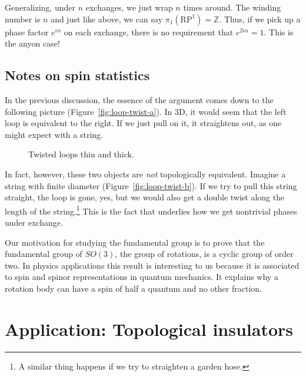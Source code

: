 \documentclass[12pt, english]{book}
\begin{document}
Generalizing, under $n$ exchanges, we just wrap $n$ times around.
The winding number is $n$ and just like above, we can say $\pi_1 (\mathrm{RP}^1) = \mathbb{Z}$.
Thus, if we pick up a phase factor $e^{i\alpha}$ on each exchange, there is no requirement that $e^{2i \alpha} = 1$.
This is the anyon case!


\subsection{Notes on spin statistics}

In the previous discussion, the essence of the argument comes down to the following picture (Figure~\ref{fig:loop-twist-a}).
In 3D, it would seem that the left loop is equivalent to the right.
If we just pull on it, it straightens out, as one might expect with a string.

\begin{figure}[!ht]
	\centering 
	 \hspace{8ex} 
	\caption{Twisted loops thin and thick.}
	\label{fig:loop-twist}
\end{figure}

In fact, however, these two objects are \emph{not} topologically equivalent.
Imagine a string with finite diameter (Figure~\ref{fig:loop-twist-b}).
If we try to pull this string straight, the loop is gone, yes, but we would also get a double twist along the length of the string.\footnote{A similar thing happens if we try to straighten a garden hose.}
This is the fact that underlies how we get nontrivial phases under exchange.


Our motivation for studying the fundamental group is to prove that the fundamental group of $SO(3)$, the group of rotations, is a cyclic group of order two. 
In physics applications this result is interesting to us because it is associated to spin and spinor representations in quantum mechanics. 
It explains why a rotation body can have a spin of half a quantum and no other fraction.




\section{Application: Topological insulators}
\end{document}
